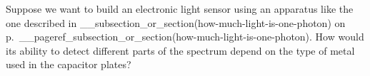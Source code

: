 Suppose we want to build an electronic light sensor using
an apparatus like the one described in __subsection_or_section(how-much-light-is-one-photon)
on p.~__pageref_subsection_or_section(how-much-light-is-one-photon).
How would its ability to detect
different parts of the spectrum depend on the type of metal
used in the capacitor plates?
